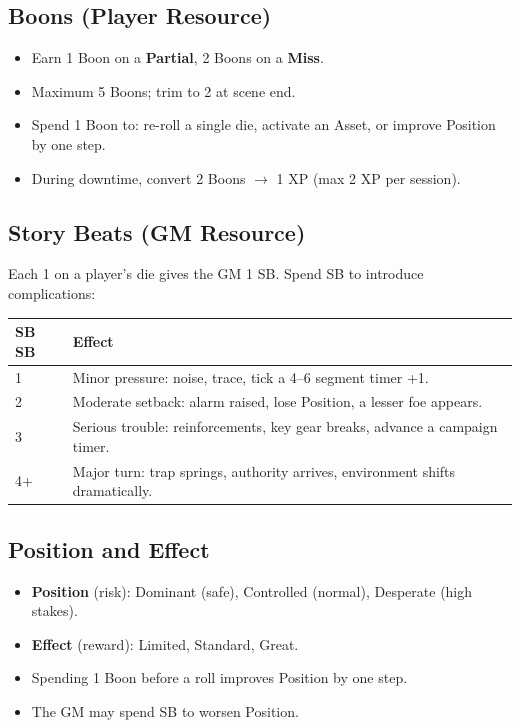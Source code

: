 \subsection*{Boons (Player Resource)}

\begin{itemize}
  \item Earn 1 Boon on a \textbf{Partial}, 2 Boons on a \textbf{Miss}.
  \item Maximum 5 Boons; trim to 2 at scene end.
  \item Spend 1 Boon to: re-roll a single die, activate an Asset, or improve Position by one step.
  \item During downtime, convert 2 Boons $\rightarrow$ 1 XP (max 2 XP per session).
\end{itemize}

\subsection*{Story Beats (GM Resource)}

Each 1 on a player's die gives the GM 1 SB. Spend SB to introduce complications:

\begin{tabular}{@{}ll@{}}
\toprule
\textbf{SB SB} & \textbf{Effect} \\
\midrule
1 & Minor pressure: noise, trace, tick a 4--6 segment timer +1. \\
2 & Moderate setback: alarm raised, lose Position, a lesser foe appears. \\
3 & Serious trouble: reinforcements, key gear breaks, advance a campaign timer. \\
4+ & Major turn: trap springs, authority arrives, environment shifts dramatically. \\
\bottomrule
\end{tabular}

\subsection*{Position and Effect}

\begin{itemize}
  \item \textbf{Position} (risk): Dominant (safe), Controlled (normal), Desperate (high stakes).
  \item \textbf{Effect} (reward): Limited, Standard, Great.
  \item Spending 1 Boon before a roll improves Position by one step.
  \item The GM may spend SB to worsen Position.
\end{itemize}

